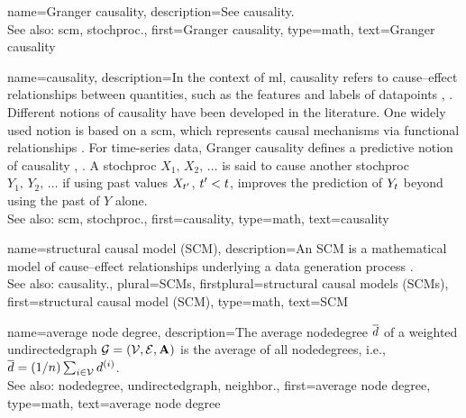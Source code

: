 {name={Granger causality},
	description={See \gls{causality}.
		\\
		See also: \gls{scm}, \gls{stochproc}.},
	first={Granger causality},
	type=math,
	text={Granger causality}
}

{name={causality},
	description={In the context of \gls{ml}, causality refers to 
		cause–effect relationships between quantities, such as the 
		\glspl{feature} and \glspl{label} of \glspl{datapoint} 
		\cite{Pearl:2010aa}, \cite{Thurman1988}. Different notions of causality 
		have been developed in the literature. One widely used notion 
		is based on a \gls{scm}, which represents causal mechanisms via 
		functional relationships \cite{Pearl:2010aa}. 
		For time-series \gls{data}, Granger causality defines a predictive 
		notion of causality \cite{Deistler2022}, \cite{Granger1969}. A 
		\gls{stochproc} $X_{1},\,X_{2},\,\ldots$ is said to cause another 
		\gls{stochproc} $Y_{1},\,Y_{2},\,\ldots$ if using past values 
		$X_{t'}$, $t' < t$, improves the \gls{prediction} 
		of $Y_{t}$ beyond using the past of $Y$ alone. 
		\\ 
		See also: \gls{scm}, \gls{stochproc}.},
	first={causality},
	type=math,
	text={causality}
}

{name={structural causal model (SCM)},
	description={An SCM 
		is a mathematical \gls{model} of cause–effect relationships underlying 
		a \gls{data} generation process \cite{Pearl:2010aa}. 
		\\
		See also: \gls{causality}.},
	plural={SCMs},
	firstplural={structural causal models (SCMs)},
	first={structural causal model (SCM)},
	type=math,
	text={SCM}
}

{name={average node degree},
	description={The average \gls{nodedegree} $\overline{d}$ of a weighted 
		\gls{undirectedgraph} $\mathcal{G}=(\mathcal{V},\mathcal{E},{\bf A})$ is the average of 
		all \glspl{nodedegree}, i.e., $\overline{d} = (1/n) \sum_{i \in \mathcal{V}} d^{(i)}$.
					\\ 
		See also: \gls{nodedegree}, \gls{undirectedgraph}, \gls{neighbor}.},
	first={average node degree},
	type=math, 
	text={average node degree} 
}


